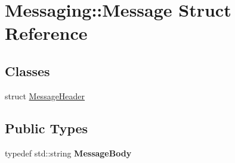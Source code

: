 \hypertarget{struct_messaging_1_1_message}{}\section{Messaging\+:\+:Message Struct Reference}
\label{struct_messaging_1_1_message}
\subsection*{Classes}
\begin{DoxyCompactItemize}
\item 
struct \hyperlink{struct_messaging_1_1_message_1_1_message_header}{Message\+Header}
\end{DoxyCompactItemize}
\subsection*{Public Types}
\begin{DoxyCompactItemize}
\item 
typedef std\+::string {\bfseries Message\+Body}\hypertarget{struct_messaging_1_1_message_a6e58a0f71d17a8950334fca1383fd514}{}\label{struct_messaging_1_1_message_a6e58a0f71d17a8950334fca1383fd514}

\end{DoxyCompactItemize}
